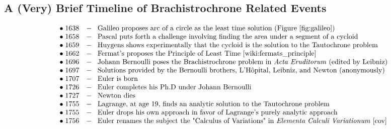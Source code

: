 \documentclass{article}
\theoremstyle{definition}
\begin{document}
\subsection{A (Very) Brief Timeline of Brachistrochrone Related Events}

\bigskip

\begin{equation*}
\begin{array}{lll}
&\bullet \; 1638  & - \;\;\; \text{Galileo proposes arc of a circle as the least time solution (Figure \ref{fig:galileo})}             \\
&\bullet \; 1658  & - \;\;\; \text{Pascal puts forth a challenge involving finding the area under a segment of a cycloid}              \\
&\bullet \; 1659  & - \;\;\; \text{Huygens shows experimentally that the cycloid is the solution to the Tautochrone problem}           \\
&\bullet \; 1662  & - \;\;\; \text{Fermat's proposes the Principle of Least Time \cite{wiki:fermats_principle}}                        \\
&\bullet \; 1696  & - \;\;\; \text{Johann Bernoulli poses the Brachistrochrone problem in \emph{Acta Eruditorum} (edited by Leibniz)}  \\
&\bullet \; 1697  & - \;\;\; \text{Solutions provided by the Bernoulli brothers, L'H\^{o}pital, Leibniz, and Newton (anonymously)}     \\
&\bullet \; 1707  & - \;\;\; \text{Euler is born}                                                                                      \\
&\bullet \; 1726  & - \;\;\; \text{Euler completes his Ph.D under Johann Bernoulli}                                                    \\
&\bullet \; 1727  & - \;\;\; \text{Newton dies}                                                                                        \\
&\bullet \; 1755  & - \;\;\; \text{Lagrange, at age 19, finds an analytic solution to the Tautochrone problem}                         \\
&\bullet \; 1755  & - \;\;\; \text{Euler drops his own approach in favor of Lagrange's purely analytic approach}                       \\
&\bullet \; 1756  & - \;\;\; \text{Euler renames the subject the "Calculus of Variations" in \emph{Elementa Calculi Variationum} \cite{cov}}
\end{array}
\end{equation*}
\end{document}
